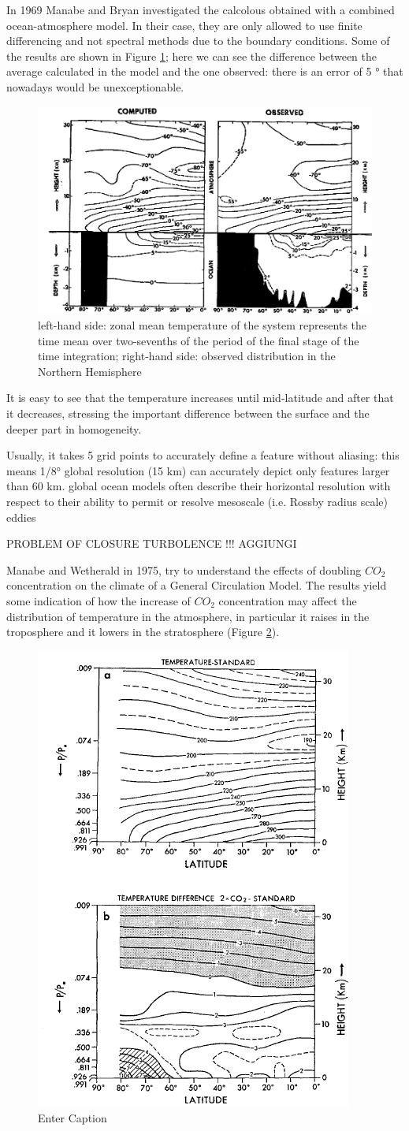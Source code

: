 In 1969 Manabe and Bryan investigated the calcolous obtained with a combined ocean-atmosphere model. In their case, they are only allowed to use finite differencing and not spectral methods due to the boundary conditions. Some of the results are shown in Figure \ref{fig:result}; here we can see the difference between the average calculated in the model and the one observed: there is an error of 5 ° that nowadays would be unexceptionable.


\begin{figure}[h!]
	\centering
	\includegraphics[width=0.5\linewidth]{uploads/50image.png}
	\caption{left-hand side: zonal mean temperature of the system represents the time mean over two-sevenths of the period of the final stage of the time integration; right-hand side: observed distribution in the Northern Hemisphere}
	\label{fig:result}
\end{figure}

It is easy to see that the temperature increases until mid-latitude and after that it decreases, stressing the important difference between the surface and the deeper part in homogeneity.


Usually, it takes 5 grid points to accurately define a
feature without aliasing: this means 1/8°
global resolution (15 km) can accurately
depict only features larger than 60 km.
global ocean models often describe their horizontal
resolution with respect to their ability to permit or
resolve mesoscale (i.e. Rossby radius scale) eddies

PROBLEM OF CLOSURE TURBOLENCE !!! AGGIUNGI


Manabe and Wetherald in 1975, try to understand the effects of doubling $CO_2$ concentration on the climate of a General Circulation Model. The results yield some indication of how the increase of $CO_2$ concentration may affect the distribution of temperature in the atmosphere, in particular it raises in the troposphere and it lowers in the stratosphere (Figure \ref{fig:fig 51}).
\begin{figure}[h!]
	\centering
	\includegraphics[width=0.3\linewidth]{uploads/51image.png}
	\caption{Enter Caption}
	\label{fig:fig 51}
\end{figure}


